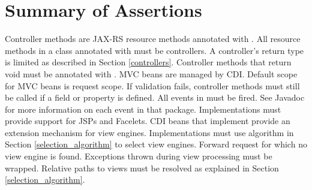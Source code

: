 \chapter{Summary of Assertions}
\label{assertions}

\begin{description}
 Controller methods are JAX-RS resource methods annotated with .
 All resource methods in a class annotated with  must
be controllers.
 A controller's return type is limited as described in Section 
\ref{controllers}.
 Controller methods that return void must be annotated with .
 MVC beans are managed by CDI.
 Default scope for MVC beans is request scope.
 If validation fails, controller methods must still be called if a 
 field or property is defined. 
 All events in  must be fired. See Javadoc for more
information on each event in that package.
 Implementations must provide support for JSPs and Facelets.
 CDI beans that implement  provide
an extension mechanism for view engines.
 Implementations must use algorithm in Section \ref{selection_algorithm} 
to select view engines.
 Forward request for which no view engine is found.
 Exceptions thrown during view processing must be wrapped.
 Relative paths to views must be resolved as explained in 
Section \ref{selection_algorithm}.
\end{description}
